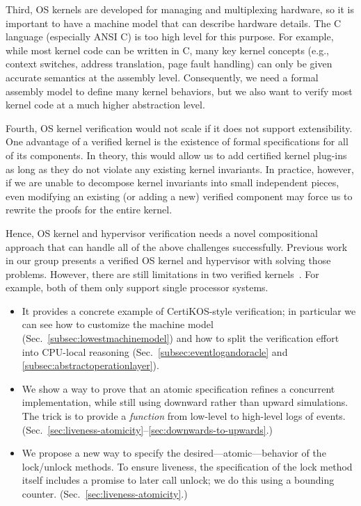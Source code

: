 {Third, OS kernels are developed for managing and multiplexing hardware, so it is important to have a machine model that can describe hardware details.
The C language (especially ANSI C) is too high level for this purpose. For example, while most kernel code can be written in C, many key kernel concepts (e.g., context switches, address translation, page fault handling) can only be given accurate semantics at the assembly level. Consequently, we need a formal assembly model to define many kernel behaviors, but we also want to verify most kernel code at a much higher abstraction level.

Fourth, OS kernel verification would not scale if it does not  support extensibility.
One advantage of a verified kernel is the existence of formal specifications for all of its components. 
In theory, this would allow us to add certified kernel plug-ins as long as they do not violate any existing kernel invariants.
In practice, however, if we are unable to decompose kernel invariants into small independent pieces, even modifying an existing (or adding a new) verified component may force us to rewrite the proofs for the entire kernel.

Hence, OS kernel and hypervisor verification needs a novel compositional approach that can handle all of the above challenges successfully. 
Previous work~\cite{dscal15} in our group presents a verified OS kernel and hypervisor with solving those problems. 
However, there are still limitations in two verified kernels~\cite{dscal15, klein2009sel4}.
For example, both of them only support single processor systems.
%



\begin{itemize}
\item It provides a concrete example of CertiKOS-style verification; in particular we can see how to customize the machine model (Sec.~\ref{subsec:lowestmachinemodel}) and how to split the verification effort into CPU-local reasoning (Sec.~\ref{subsec:eventlogandoracle} and \ref{subsec:abstractoperationlayer}).
  
\item We show a way to prove that an atomic specification refines a concurrent implementation, while still using downward rather than upward simulations. The trick is to provide a \emph{function} from low-level to high-level logs of events. (Sec.~\ref{sec:liveness-atomicity}--\ref{sec:downwards-to-upwards}.)

\item We propose a new way to specify the desired---atomic---behavior of the lock/unlock methods. To ensure liveness, the specification of the lock method itself includes a promise to later call unlock; we do this using a bounding counter. (Sec.~\ref{sec:liveness-atomicity}.)


\end{itemize}}
